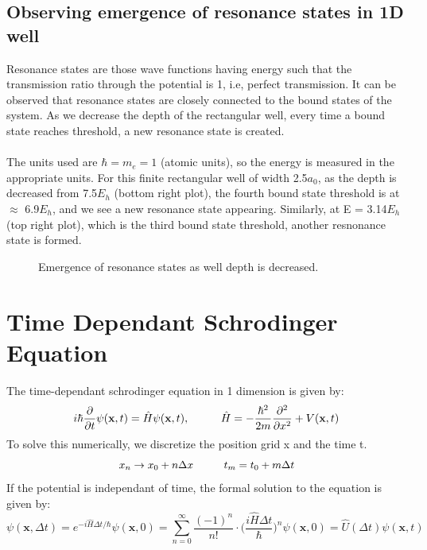 \documentclass{article}
\begin{document}
\subsection{Observing emergence of resonance states in 1D well}
Resonance states are those wave functions having energy such that the transmission ratio through the potential is 1, i.e, perfect transmission. It can be observed that resonance states are closely connected to the bound states of the system. As we decrease the depth of the rectangular well, every time a bound state reaches threshold, a new resonance state is created.\cite{resonanceemergence}\cite{nussen}
\\
\\
The units used are $\hbar = m_e = 1$ (atomic units), so the energy is measured in the appropriate units. For this finite rectangular well of width 2.5$a_0$, as the depth is decreased from 7.5$E_h$ (bottom right plot), the fourth bound state threshold is at $\approx$ 6.9$E_h$, and we see a new resonance state appearing. Similarly, at E = 3.14$E_h$ (top right plot), which is the third bound state threshold, another resnonance state is formed. 
\begin{figure}[h!]
\caption{Emergence of resonance states as well depth is decreased.}
\end{figure}


\newpage 
\section{Time Dependant Schrodinger Equation}
The time-dependant schrodinger equation in 1 dimension is given by:
$$i\hbar\frac{\partial}{\partial t} \psi(\textbf{x},t) = \hat{H}\psi(\textbf{x},t) ,\hspace{1 cm} \hat{H}=-\frac{\hbar^2}{2m}\frac{\partial^2}{\partial x^2} + V(\textbf{x},t)$$
To solve this numerically, we discretize the position grid x and the time t. 
$$x_n \rightarrow x_0+n\Delta x \hspace{1 cm} t_m = t_0+m\Delta t$$
If the potential is independant of time, the formal solution to the equation is given by: 
$$\psi(\textbf{x},\Delta t) = e^{-i\hat{H}\Delta t/ \hbar}\psi(\textbf{x},0) = \sum_{n=0}^{\infty} \frac{(-1)^n}{n!}\cdot\bigg( \frac{i\hat{H}\Delta t}{\hbar} \bigg )^n \psi(\textbf{x},0) = \hat{U}(\Delta t)\psi(\textbf{x},t)$$
\end{document}
